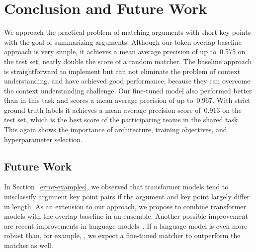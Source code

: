 \section{Conclusion and Future Work}\label{conclusion}

We approach the practical problem of matching arguments with short key points with the goal of summarizing arguments.
Although our token overlap baseline approach is very simple, it achieves a mean average precision of up to~0.575 on 
the test set, nearly double the score of a random matcher. 
The baseline approach is straightforward to implement but can not eliminate the problem of context understanding. 
\RobertaBase and \BertBase have achieved good performance, because they can overcome the context understanding challenge. 
Our fine-tuned \RobertaBase model also performed better than \BertBase in this task and scores a mean average 
precision of up to~0.967.
With strict ground truth labels it achieves a mean average precision score of~0.913 on the test set, which is the best 
score of the participating teams in the shared task.
This again shows the importance of architecture, training objectives, and hyperparameter selection.

\subsection{Future Work}

In Section~\ref{error-examples}, we observed that transformer models tend to misclassify argument key point pairs if the argument and key point largely differ in length. As an extension to our approach, we propose to combine transformer models with the overlap baseline in an ensemble. Another possible improvement are recent improvements in language models~\cite{Sun2021WFDPSLCZLLWGLSSLOYTWW}.
If a language model is even more robust than, for example, \Roberta, we expect a fine-tuned matcher to outperform the \RobertaBase matcher as well.
